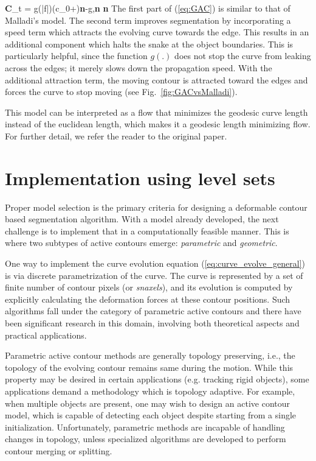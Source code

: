 \bea
\textbf{C}_t = g(|\nabla f|)(c_0+\kappa)\;\textbf{n}-\langle\nabla g,\textbf{n} \rangle \;\textbf{n}
\label{eq:GAC}
\eea
The first part of (\ref{eq:GAC}) is similar to that of Malladi's model. The second term improves segmentation by incorporating a speed term which attracts the evolving curve towards the edge. This results in an additional component which halts the snake at the object boundaries. This is particularly helpful, since the function $g(.)$ does not stop the curve from leaking across the edges; it merely slows down the propagation speed. With the additional attraction term, the moving contour is attracted toward the edges and forces the curve to stop moving (see Fig.~\ref{fig:GACvsMalladi}).

 
This model can be interpreted as a flow that minimizes the geodesic curve length instead of the euclidean length, which makes it a geodesic length minimizing flow. For further detail, we refer the reader to the original paper\cite{caselles_GAC}.

\section{Implementation using level sets}
Proper model selection is the primary criteria for designing a deformable contour based segmentation algorithm. With a model already developed, the next challenge is to implement that in a computationally feasible manner. This is where two subtypes of active contours emerge: \textit{parametric} and \textit{geometric}.

One way to implement the curve evolution equation (\ref{eq:curve_evolve_general}) is via discrete parametrization of the curve. The curve is represented by a set of finite number of contour pixels (or \textit{snaxels}), and its  evolution is computed by explicitly calculating the deformation forces at these contour positions. Such algorithms fall under the category of parametric active contours and there have been significant research in this domain, involving both theoretical aspects
\cite{kwt_snakes,li_VFC,xu_GVF_journal,li_PIG,jacob2004efficient,bspline_snake,mishra2011decoupled} and practical applications\cite{leucocyte_dipti,ray2003merging,ray2002tracking,lesage2009review,zhu2014complete}. 

Parametric active contour methods are generally topology preserving, i.e., the topology of the evolving contour remains same during the motion. While this property may be desired in certain applications (e.g. tracking rigid objects), some applications demand a methodology which is topology adaptive. For example, when multiple objects are present, one may wish to design an active contour model, which is capable of detecting each object despite starting from a single initialization. Unfortunately, parametric methods are incapable of handling changes in topology, unless specialized algorithms are developed to perform contour merging or splitting.

